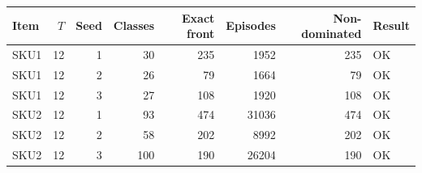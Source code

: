 \begin{tabular}{lrrrrrrl}
\toprule
Item & $T$ & Seed & Classes & Exact front & Episodes & Non-dominated & Result\\
\midrule
SKU1 & 12 & 1 & 30 & 235 & 1952 & 235 & OK\\
SKU1 & 12 & 2 & 26 & 79 & 1664 & 79 & OK\\
SKU1 & 12 & 3 & 27 & 108 & 1920 & 108 & OK\\
SKU2 & 12 & 1 & 93 & 474 & 31036 & 474 & OK\\
SKU2 & 12 & 2 & 58 & 202 & 8992 & 202 & OK\\
SKU2 & 12 & 3 & 100 & 190 & 26204 & 190 & OK\\
\bottomrule
\end{tabular}
